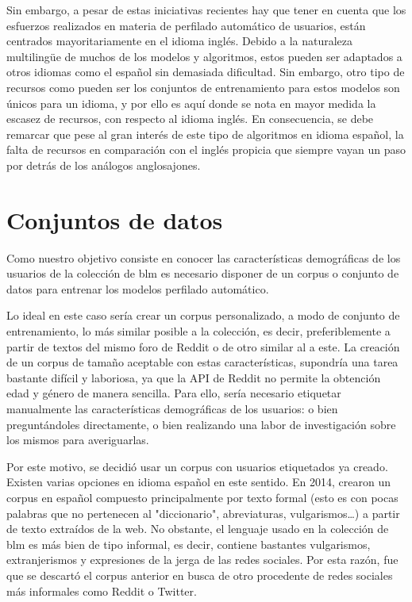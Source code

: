 Sin embargo, a pesar de estas iniciativas recientes hay que tener en cuenta que los esfuerzos realizados en materia de perfilado automático de usuarios, están centrados mayoritariamente en el idioma inglés. Debido a la naturaleza multilingüe de muchos de los modelos y algoritmos, estos pueden ser adaptados a otros idiomas como el español sin demasiada dificultad. Sin embargo, otro tipo de recursos como pueden ser los conjuntos de entrenamiento para estos modelos son únicos para un idioma, y por ello es aquí donde se nota en mayor medida la escasez de recursos, con respecto al idioma inglés. En consecuencia, se debe remarcar que pese al gran interés de este tipo de algoritmos en idioma español, la falta de recursos en comparación con el inglés propicia que siempre vayan un paso por detrás de los análogos anglosajones.

\section{Conjuntos de datos}
\label{sec:datasets}
Como nuestro objetivo consiste en conocer las características demográficas de los usuarios de la colección de \acrshort{blm} es necesario disponer de un corpus o conjunto de datos para entrenar los modelos perfilado automático.

Lo ideal en este caso sería crear un corpus personalizado, a modo de conjunto de entrenamiento, lo más similar posible a la colección, es decir, preferiblemente a partir de textos del mismo foro de Reddit o de otro similar al a este. La creación de un corpus de tamaño aceptable con estas características, supondría una tarea bastante difícil y laboriosa, ya que la API de Reddit no permite la obtención edad y género de manera sencilla. Para ello, sería necesario etiquetar manualmente las características demográficas de los usuarios: o bien preguntándoles directamente, o bien realizando una labor de investigación sobre los mismos para averiguarlas.

Por este motivo, se decidió usar un corpus con usuarios etiquetados ya creado. Existen varias opciones en idioma español en este sentido. En 2014, \citet{SpanText} crearon un corpus en español compuesto principalmente por texto formal (esto es con pocas palabras que no pertenecen al "diccionario", abreviaturas, vulgarismos\dots) a partir de texto extraídos de la web. No obstante, el lenguaje usado en la colección de \acrshort{blm} es más bien de tipo informal, es decir, contiene bastantes vulgarismos, extranjerismos y expresiones de la jerga de las redes sociales. Por esta razón, fue que se descartó el corpus anterior en busca de otro procedente de redes sociales más informales como Reddit o Twitter.

